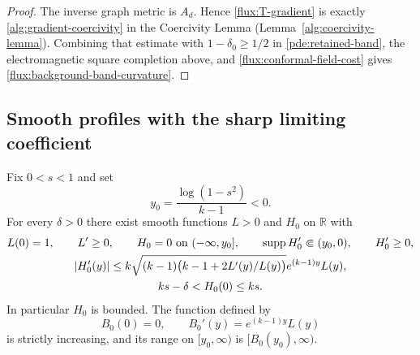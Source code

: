 \begin{proof}
The inverse graph metric is $A_d$. Hence
\eqref{flux:T-gradient} is exactly
\eqref{alg:gradient-coercivity} in the Coercivity Lemma
(Lemma~\ref{alg:coercivity-lemma}). Combining that estimate with
$1-\delta_0\geq1/2$ in \eqref{pde:retained-band}, the electromagnetic
square completion above, and \eqref{flux:conformal-field-cost}
gives \eqref{flux:background-band-curvature}.
\end{proof}

\subsection{Smooth profiles with the sharp limiting coefficient}

\begin{lemma}
\label{flux:profiles}
Fix $0<s<1$ and set
\begin{equation}
 y_0=\frac{\log(1-s^2)}{k-1}<0.
 \label{flux:floor}
\end{equation}
For every $\delta>0$ there exist smooth functions $L>0$ and $H_0$ on
$\mathbb R$ with
\begin{gather}
 L(0)=1,\qquad L'\geq0,\qquad
 H_0=0\text{ on }(-\infty,y_0],\qquad
 \operatorname{supp} H_0'\Subset(y_0,0),\qquad H_0'\geq0,
 \label{flux:profile-properties}\\
 |H_0'(y)|\leq
 k\sqrt{(k-1)\bigl(k-1+2L'(y)/L(y)\bigr)}
 e^{(k-1)y}L(y),
 \label{flux:profile-discriminant}\\
 ks-\delta<H_0(0)\leq ks.
 \label{flux:profile-value}
\end{gather}
In particular $H_0$ is bounded.  The function defined by
\begin{equation}
 B_0(0)=0,\qquad B_0'(y)=e^{(k-1)y}L(y)
 \label{flux:B-definition}
\end{equation}
is strictly increasing, and its range on $[y_0,\infty)$ is
$[B_0(y_0),\infty)$.
\end{lemma}


